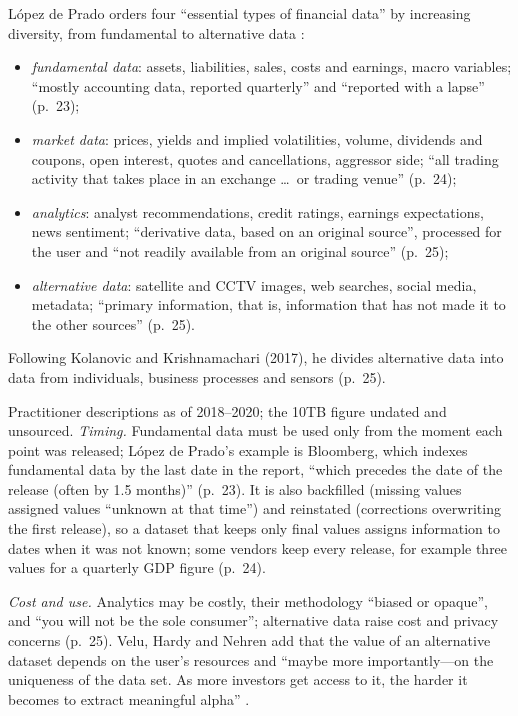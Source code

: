 \begin{qfdefinition}\label{def:financial-data-types}
 López de Prado orders four ``essential types of financial data'' by increasing diversity, from fundamental to alternative data \citep[chap.~2, sec.~2.2, Table~2.1, pp.~23--24]{alpha-afml}:
\begin{itemize}\setlength{\itemsep}{0pt}
\item \emph{fundamental data}: assets, liabilities, sales, costs and earnings, macro variables; ``mostly accounting data, reported quarterly'' and ``reported with a lapse'' (p.~23);
\item \emph{market data}: prices, yields and implied volatilities, volume, dividends and coupons, open interest, quotes and cancellations, aggressor side; ``all trading activity that takes place in an exchange \dots\ or trading venue'' (p.~24);
\item \emph{analytics}: analyst recommendations, credit ratings, earnings expectations, news sentiment; ``derivative data, based on an original source'', processed for the user and ``not readily available from an original source'' (p.~25);
\item \emph{alternative data}: satellite and CCTV images, web searches, social media, metadata; ``primary information, that is, information that has not made it to the other sources'' (p.~25).
\end{itemize}
Following Kolanovic and Krishnamachari (2017), he divides alternative data into data from individuals, business processes and sensors (p.~25).

 Practitioner descriptions as of 2018--2020; the 10TB figure undated and unsourced. \emph{Timing.} Fundamental data must be used only from the moment each point was released; López de Prado's example is Bloomberg, which indexes fundamental data by the last date in the report, ``which precedes the date of the release (often by 1.5 months)'' (p.~23). It is also backfilled (missing values assigned values ``unknown at that time'') and reinstated (corrections overwriting the first release), so a dataset that keeps only final values assigns information to dates when it was not known; some vendors keep every release, for example three values for a quarterly GDP figure (p.~24).

\emph{Cost and use.} Analytics may be costly, their methodology ``biased or opaque'', and ``you will not be the sole consumer''; alternative data raise cost and privacy concerns (p.~25). Velu, Hardy and Nehren add that the value of an alternative dataset depends on the user's resources and ``maybe more importantly---on the uniqueness of the data set. As more investors get access to it, the harder it becomes to extract meaningful alpha'' \citep[chap.~1, sec.~1.4.4, pp.~43--44]{s3-velu}.


\end{qfdefinition}
